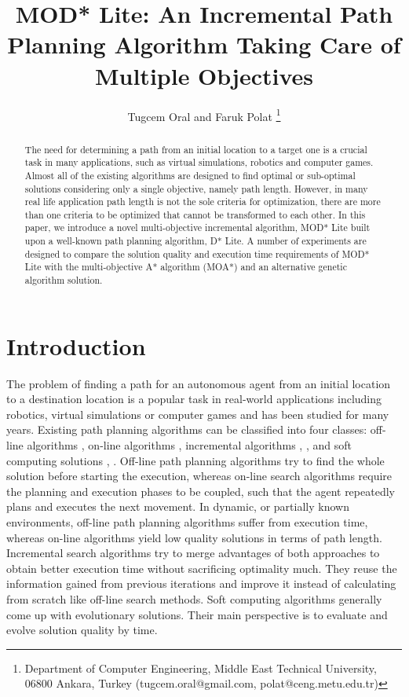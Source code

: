 \documentclass[10pt,journal]{IEEEtran}
\begin{document}
\title{MOD* Lite: An Incremental Path Planning Algorithm Taking Care of Multiple Objectives}

\author{Tugcem Oral and Faruk Polat
\thanks{Department of Computer Engineering, Middle East Technical University, 06800 Ankara, Turkey (tugcem.oral@gmail.com, polat@ceng.metu.edu.tr)}}

\maketitle

\begin{abstract}
The need for determining a path from an initial location to a target one is a crucial task in many applications, such as virtual simulations, robotics and computer games. Almost all of the existing algorithms are designed to find optimal or sub-optimal solutions considering only a single objective, namely path length.  However, in many real life application path length is not the sole criteria for optimization, there are more than one criteria to be optimized that cannot be transformed to each other. In this paper, we introduce  a novel multi-objective incremental algorithm, MOD* Lite built upon a well-known path planning algorithm, D* Lite. A number of experiments are designed to compare the solution quality and execution time requirements of MOD* Lite with the multi-objective A* algorithm (MOA*) and an alternative genetic algorithm solution.
\end{abstract}

\section{Introduction}
\label{chapter:introduction}

The problem of finding a path for an autonomous agent from an initial location to a destination location is a popular task in real-world applications including robotics, virtual simulations or computer games and has been studied for many years. Existing path planning algorithms can be classified into four classes: off-line algorithms \cite{Dijkstra:1959} \cite{AStarHart:1968}, on-line algorithms \cite{RTAStarKorf:1990}, incremental algorithms \cite{DStar:1994}, \cite{Koenig:2002}, \cite{FocussedDStarStentz:1995} and soft computing solutions \cite{Tarapata:2007}, \cite{Pangilinan}. Off-line path planning algorithms try to find the whole solution before starting the execution, whereas on-line search algorithms require the planning and execution phases to be coupled, such that the agent repeatedly plans and executes the next movement. In dynamic, or partially known environments, off-line path planning algorithms suffer from execution time, whereas on-line algorithms yield low quality solutions in terms of path length. Incremental search algorithms try to merge advantages of both approaches to obtain better execution time without sacrificing optimality much. They reuse the information gained from previous iterations and improve it instead of calculating from scratch like off-line search methods. Soft computing algorithms generally come up with evolutionary solutions. Their main perspective is to evaluate and evolve solution quality by time. 
\end{document}

